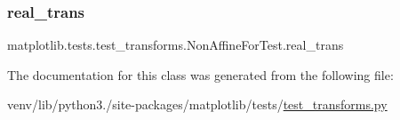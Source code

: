 \subsubsection{\texorpdfstring{real\+\_\+trans}{real\_trans}}
{\footnotesize\ttfamily matplotlib.\+tests.\+test\+\_\+transforms.\+Non\+Affine\+For\+Test.\+real\+\_\+trans}



The documentation for this class was generated from the following file\+:\begin{DoxyCompactItemize}
\item 
venv/lib/python3./site-\/packages/matplotlib/tests/\hyperlink{test__transforms_8py}{test\+\_\+transforms.\+py}\end{DoxyCompactItemize}
